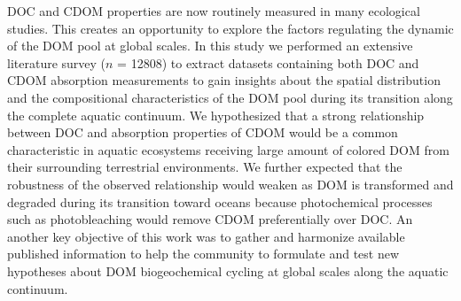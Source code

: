 DOC and CDOM properties are now routinely measured in many ecological studies. This creates an opportunity to explore the factors regulating the dynamic of the DOM pool at global scales. In this study we performed an extensive literature survey ($n$ = 12808) to extract datasets containing both DOC and CDOM absorption measurements to gain insights about the spatial distribution and the compositional characteristics of the DOM pool during its transition along the complete aquatic continuum. We hypothesized that a strong relationship between DOC and absorption properties of CDOM would be a common characteristic in aquatic ecosystems receiving large amount of colored DOM from their surrounding terrestrial environments. We further expected that the robustness of the observed relationship would weaken as DOM is transformed and degraded during its transition toward oceans because photochemical processes such as photobleaching would remove CDOM preferentially over DOC. An another key objective of this work was to gather and harmonize available published information to help the community to formulate and test new hypotheses about DOM biogeochemical cycling at global scales along the aquatic continuum.
